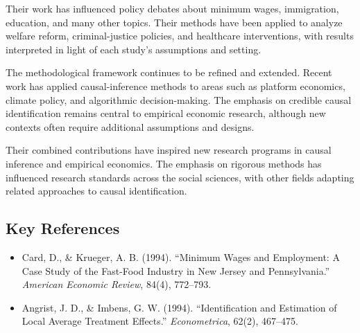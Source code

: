 Their work has influenced policy debates about minimum wages, immigration,
education, and many other topics. Their methods have been applied to analyze
welfare reform, criminal-justice policies, and healthcare interventions, with
results interpreted in light of each study's assumptions and setting.

The methodological framework continues to be refined and extended. Recent work
has applied causal-inference methods to areas such as platform economics,
climate policy, and algorithmic decision-making. The emphasis on credible causal
identification remains central to empirical economic research, although new
contexts often require additional assumptions and designs.

Their combined contributions have inspired new research programs in causal
inference and empirical economics. The emphasis on rigorous methods has
influenced research standards across the social sciences, with other fields
adapting related approaches to causal identification.

\subsection*{Key References}
\begin{itemize}
    \item Card, D., \& Krueger, A. B. (1994). ``Minimum Wages and Employment: A Case Study of the Fast-Food Industry in New Jersey and Pennsylvania.'' \textit{American Economic Review}, 84(4), 772--793.
    \item Angrist, J. D., \& Imbens, G. W. (1994). ``Identification and Estimation of Local Average Treatment Effects.'' \textit{Econometrica}, 62(2), 467--475.
\end{itemize}
